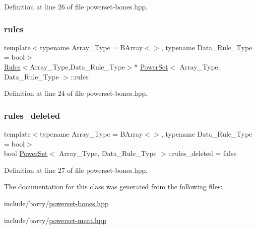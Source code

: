 Definition at line 26 of file powerset-\/bones.\+hpp.

\mbox{\label{class_power_set_afa542ecc31858c8644d1e76078eb1713}} 
\subsubsection{\texorpdfstring{rules}{rules}}
{\footnotesize\ttfamily template$<$typename Array\+\_\+\+Type  = B\+Array$<$$>$, typename Data\+\_\+\+Rule\+\_\+\+Type  = bool$>$ \\
\hyperlink{class_rules}{Rules}$<$Array\+\_\+\+Type,Data\+\_\+\+Rule\+\_\+\+Type$>$$\ast$ \hyperlink{class_power_set}{Power\+Set}$<$ Array\+\_\+\+Type, Data\+\_\+\+Rule\+\_\+\+Type $>$\+::rules}



Definition at line 24 of file powerset-\/bones.\+hpp.

\mbox{\label{class_power_set_a08b6baf1e244e023d997ddaecbc2116f}} 
\subsubsection{\texorpdfstring{rules\+\_\+deleted}{rules\_deleted}}
{\footnotesize\ttfamily template$<$typename Array\+\_\+\+Type  = B\+Array$<$$>$, typename Data\+\_\+\+Rule\+\_\+\+Type  = bool$>$ \\
bool \hyperlink{class_power_set}{Power\+Set}$<$ Array\+\_\+\+Type, Data\+\_\+\+Rule\+\_\+\+Type $>$\+::rules\+\_\+deleted = false}



Definition at line 27 of file powerset-\/bones.\+hpp.



The documentation for this class was generated from the following files\+:\begin{DoxyCompactItemize}
\item 
include/barry/\hyperlink{powerset-bones_8hpp}{powerset-\/bones.\+hpp}\item 
include/barry/\hyperlink{powerset-meat_8hpp}{powerset-\/meat.\+hpp}\end{DoxyCompactItemize}
